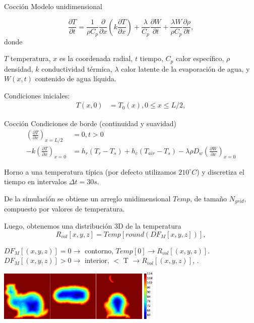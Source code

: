 \documentclass[spanish,unknownkeysallowed]{beamer}
\begin{document}
\begin{frame}{Cocción}
Modelo unidimensional

\begin{equation}
\label{Eq:heat}
\frac{\partial T}{\partial t} = \frac{1}{\rho C_{p}} \frac{\partial}{\partial x} \left ( k \frac{\partial T}{\partial x} \right ) + \frac{\lambda}{C_{p}} \frac{\partial W}{\partial t}+\frac{\lambda W}{ \rho C_{p} }\frac{\partial \rho}{\partial t},
\end{equation}
%
\noindent donde

$T$ temperatura, $x$ es la coordenada radial, $t$ tiempo, $C_{p}$ calor específico, $\rho$ densidad, $k$ conductividad térmica, $\lambda$ calor latente de la evaporación de agua, y $W(x,t)$ contenido de agua líquida.

Condiciones iniciales:
\begin{align*}
T(x,0) &= T_{0}(x), 0\le x \le L/2,
\end{align*}

\end{frame}

\begin{frame}{Cocción}
Condiciones de borde (continuidad y suavidad)
\begin{align*}
\left ( \frac{\partial T}{\partial x} \right )_{x=L/2} &= 0 , t > 0 \\
-k \left ( \frac{\partial T}{\partial x} \right )_{x=0} &= h_{r}(T_{r}-T_{s}) + h_{c}(T_{air}-T_{s}) - \lambda \rho D_{w} \left (\frac{\partial W}{\partial x} \right )_{x=0}
\end{align*}
%

\end{frame}

\begin{frame}
Horno a una temperatura típica (por defecto utilizamos $210^{\circ}C$) y discretiza el tiempo en intervalos $\Delta t = 30s$.


De la simulación se obtiene un arreglo unidimensional $Temp$, de tamaño $N_{grid}$, compuesto por valores de temperatura.

Luego, obtenemos una distribución 3D de la temperatura
\begin{equation*}
\displaystyle R_{vol}[x,y,z] = Temp[ round( DF_{M}[x,y,z] ) ], 
\end{equation*}

$DF_{M}[(x,y,z)] = 0 \rightarrow$ contorno, $Temp[0] \rightarrow R_{vol}[(x,y,z)]$.
$DF_{M}[(x,y,z)] > 0 \rightarrow$ interior, $<$ T  $\rightarrow R_{vol}[(x,y,z)]$, .

\centerline{\includegraphics[width=8cm]{../figures/tempsbunny}}
\end{frame}
\end{document}
